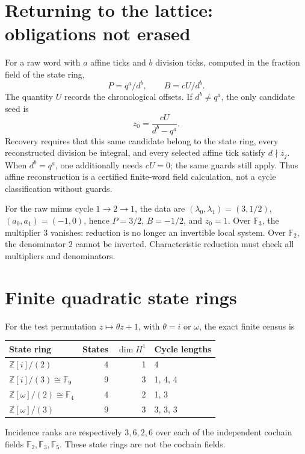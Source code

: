 \documentclass[11pt,letterpaper]{article}
\newcommand{\Z}{\mathbb{Z}}
\begin{document}
\section{Returning to the lattice: obligations not erased}

For a raw word with \(a\) affine ticks and \(b\) division ticks, computed in the fraction field of the state ring,
\[
P=q^a/d^b,\qquad B=cU/d^b.
\]
The quantity \(U\) records the chronological offsets. If \(d^b\ne q^a\), the only candidate seed is
\[
z_0=\frac{cU}{d^b-q^a}.
\]
Recovery requires that this same candidate belong to the state ring, every reconstructed division be integral, and every selected affine tick satisfy \(d\nmid z_j\). When \(d^b=q^a\), one additionally needs \(cU=0\); the same guards still apply. Thus affine reconstruction is a certified finite-word field calculation, not a cycle classification without guards.

For the raw minus cycle \(1\to2\to1\), the data are \((\lambda_0,\lambda_1)=(3,1/2)\), \((a_0,a_1)=(-1,0)\), hence \(P=3/2\), \(B=-1/2\), and \(z_0=1\). Over \(\mathbb F_3\), the multiplier \(3\) vanishes: reduction is no longer an invertible local system. Over \(\mathbb F_2\), the denominator \(2\) cannot be inverted. Characteristic reduction must check all multipliers and denominators.

\section{Finite quadratic state rings}

For the test permutation \(z\mapsto\theta z+1\), with \(\theta=i\) or \(\omega\), the exact finite census is
\begin{center}
\begin{tabular}{lrrl}
\toprule
State ring & States & \(\dim H^1\) & Cycle lengths \\
\midrule
\(\Z[i]/(2)\) & 4 & 1 & 4 \\
\(\Z[i]/(3)\cong\mathbb F_9\) & 9 & 3 & 1, 4, 4 \\
\(\Z[\omega]/(2)\cong\mathbb F_4\) & 4 & 2 & 1, 3 \\
\(\Z[\omega]/(3)\) & 9 & 3 & 3, 3, 3 \\
\bottomrule
\end{tabular}
\end{center}
Incidence ranks are respectively \(3,6,2,6\) over each of the independent cochain fields \(\mathbb F_2,\mathbb F_3,\mathbb F_5\). These state rings are not the cochain fields.
\end{document}
